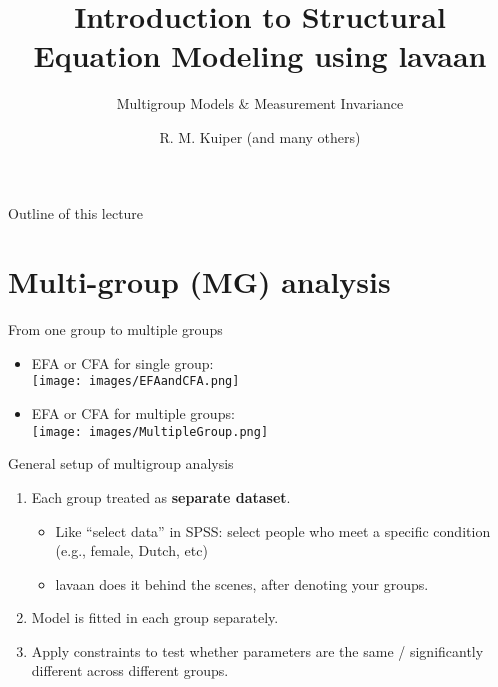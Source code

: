 \documentclass[10pt]{beamer}\usepackage[]{graphicx}\usepackage[]{xcolor}
\title{Introduction to Structural Equation Modeling using lavaan}
\subtitle{Multigroup Models \& Measurement Invariance}
\author{R. M. Kuiper (and many others)}
\institute{Department of Methodology \& Statistics \\ Utrecht University}
\date{}
\begin{document}

\begin{frame}[t, plain]
  \titlepage
\end{frame}

%
\begin{frame}{Outline of this lecture}
\tableofcontents[hidesubsections]
\end{frame}

\section{Multi-group (MG) analysis}
%
\begin{frame}{From one group to multiple groups}
\begin{itemize}
    \item EFA or CFA for single group:\\
    \texttt{[image: images/EFAandCFA.png]} 
    \item EFA or CFA for multiple groups:\\
    \texttt{[image: images/MultipleGroup.png]} 
\end{itemize}
\end{frame}
%
%
\begin{frame}{General setup of multigroup analysis}
    \begin{enumerate}
        \item Each group treated as \textbf{separate dataset}.
        \begin{itemize}
            \item  Like ``select data'' in SPSS: select people who meet a specific condition (e.g., female, Dutch, etc)
            \item lavaan does it behind the scenes, after denoting your groups.
        \end{itemize}
        \item Model is fitted in each group separately.
        \item Apply constraints to test whether parameters are the same / significantly different across different groups.
    \end{enumerate}
\end{frame}
%
\end{document}
